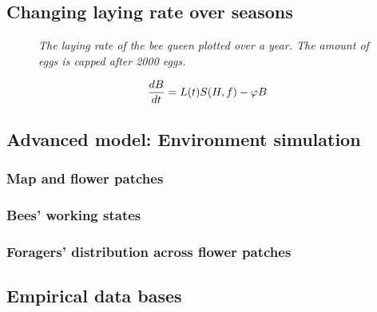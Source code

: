 	\subsection{Changing laying rate over seasons}
		\begin{figure}\label{fig:dynLayingRate}
			\centering
			\caption{\textit{The laying rate of the bee queen plotted over a year. The amount of eggs is capped after 2000 eggs.}}
		\end{figure}
		
		
		\begin{equation}\label{eq:changeBroodNumbersTime}
			{dB \over dt} = L(t)S(H,f)-\phi B
		\end{equation}
	
	\subsection{Advanced model: Environment simulation}
		\subsubsection{Map and flower patches}
		\subsubsection{Bees' working states}
			
		\subsubsection{Foragers' distribution across flower patches}
	\subsection{Empirical data bases}


